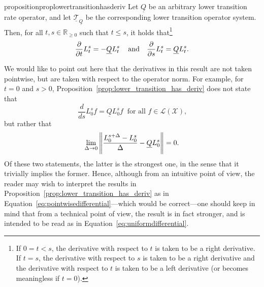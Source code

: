 \documentclass[10pt,a4paper]{paper}
\theoremstyle{definition}
\newcommand{\reals}{\mathbb{R}}
\newcommand{\realsnonneg}{\reals_{\geq 0}}
\newcommand{\states}{\mathcal{X}}
\newcommand{\lbound}{L}
\newcommand{\gambles}{\mathcal{L}}
\newcommand{\gamblesX}{\gambles(\states)}
\newcommand{\lrate}{\underline{Q}}
\newcommand{\norm}[1]{\left\lVert #1 \right\rVert}
\begin{document}
\begin{restatable}{proposition}{proplowertransitionhasderiv}
\label{prop:lower_transition_has_deriv}
Let $\lrate$ be an arbitrary lower transition rate operator, and let $\underline{\mathcal{T}}_{\lrate}$ be the corresponding lower transition operator system. Then, for all $t,s\in\realsnonneg$ such that $t\leq s$, it holds that\footnote{If $0=t<s$, the derivative with respect to $t$ is taken to be a right derivative. If $t=s$, the derivative with respect to $s$ is taken to be a right derivative and the derivative with respect to $t$ is taken to be a left derivative (or becomes meaningless if $t=0$).}
\begin{equation*}
\frac{\partial}{\partial t}\lbound_t^s=-\lrate\lbound_t^s\,\quad\text{and}\quad\frac{\partial}{\partial s}\lbound_t^s=\lrate\lbound_t^s.\vspace{7pt}
\end{equation*}
\end{restatable}
We would like to point out here that the derivatives in this result are not taken pointwise, but are taken with respect to the operator norm. For example, for $t=0$ and $s>0$, Proposition~\ref{prop:lower_transition_has_deriv} does not state that
\vspace{3pt}
\begin{equation}\label{eq:pointwisedifferential}
\frac{d}{d s}\lbound_0^sf=\lrate\lbound_0^sf
~\text{ for all $f\in\gamblesX$,}
\end{equation}
but rather that
\begin{equation}\label{eq:uniformdifferential}
\lim_{\Delta\to0}
\norm{\frac{L_0^{s+\Delta}-L_0^s}{\Delta}-\lrate L_0^s}=0.\vspace{9pt}
\end{equation}
Of these two statements, the latter is the strongest one, in the sense that it trivially implies the former. Hence, although from an intuitive point of view, the reader may wish to interpret the results in Proposition~\ref{prop:lower_transition_has_deriv} as in Equation~\eqref{eq:pointwisedifferential}---which would be correct---one should keep in mind that from a technical point of view, the result is in fact stronger, and is intended to be read as in Equation~\eqref{eq:uniformdifferential}.
\end{document}
